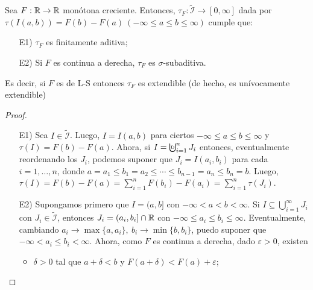 \begin{theorem}
	Sea $F: \mathbb{R} \to \mathbb{R}$ monótona creciente. Entonces, $\tau_F: \widetilde{\mathcal{I}} \to [0,\infty]$ dada por $\tau(I(a,b)) = F(b) - F(a) \ (-\infty\leq a \leq b \leq \infty)$ cumple que:
	\begin{enumerate}
		\item[E1)] $\tau_F$ es finitamente aditiva;

		\item[E2)] Si $F$ es continua a derecha, $\tau_F$ es $\sigma$-subaditiva.
	\end{enumerate}
	Es decir, si $F$ es de L-S entonces $\tau_F$ es extendible (de hecho, es unívocamente extendible)
\end{theorem}
\begin{proof}~
	\begin{enumerate}
		\item[E1)] Sea $I \in \widetilde{\mathcal{I}}$. Luego, $I = I(a,b)$ para ciertos $-\infty\leq a \leq b \leq \infty$ y $\tau(I) = F(b) - F(a)$. Ahora, si $I = \textbigcupd_{i=1}^{n} J_i$ entonces, eventualmente reordenando los $J_i$, podemos suponer que $J_i = I(a_i,b_i)$ para cada $i = 1,\dots,n$, donde $a = a_1 \leq b_1 = a_2 \leq \cdots \leq b_{n-1} = a_n \leq b_n = b$. Luego, $\tau(I) = F(b) - F(a) = \sum_{i=1}^{n} F(b_i) - F(a_i) = \sum_{i=1}^{n} \tau(J_i)$.

		\item[E2)] Supongamos primero que $I = (a,b]$ con $-\infty < a < b < \infty$. Si $I \subseteq \bigcup_{i=1}^{\infty} J_i$ con $J_i \in \widetilde{\mathcal{I}}$, entonces $J_i = (a_i,b_i] \cap \mathbb{R}$ con $-\infty\leq a_i \leq b_i \leq \infty$. Eventualmente, cambiando $a_i \longrightarrow \max \{a,a_i\},\ b_i \longrightarrow \min \{b,b_i\}$, puedo suponer que $-\infty < a_i \leq b_i < \infty$. Ahora, como $F$ es continua a derecha, dado $\varepsilon > 0$, existen
		\begin{itemize}
			\item $\delta > 0$ tal que $a + \delta < b$ y $F(a + \delta) < F(a) + \varepsilon$;


\end{itemize}
\end{enumerate}
\end{proof}

